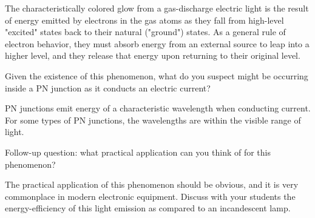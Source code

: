 

The characteristically colored glow from a gas-discharge electric light is the result of energy emitted by electrons in the gas atoms as they fall from high-level "excited" states back to their natural ("ground") states.  As a general rule of electron behavior, they must absorb energy from an external source to leap into a higher level, and they release that energy upon returning to their original level.

Given the existence of this phenomenon, what do you suspect might be occurring inside a PN junction as it conducts an electric current?







PN junctions emit energy of a characteristic wavelength when conducting current.  For some types of PN junctions, the wavelengths are within the visible range of light.

\vskip 10pt

Follow-up question: what practical application can you think of for this phenomenon?







The practical application of this phenomenon should be obvious, and it is very commonplace in modern electronic equipment.  Discuss with your students the energy-efficiency of this light emission as compared to an incandescent lamp.





